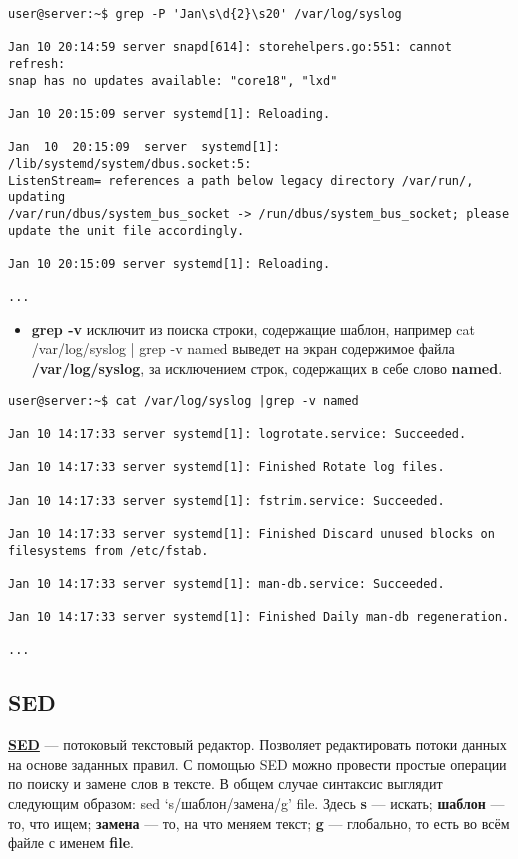 \documentclass[14pt, a4paper]{article}
\begin{document}
\begin{lstlisting}
user@server:~$ grep -P 'Jan\s\d{2}\s20' /var/log/syslog

Jan 10 20:14:59 server snapd[614]: storehelpers.go:551: cannot refresh: 
snap has no updates available: "core18", "lxd"

Jan 10 20:15:09 server systemd[1]: Reloading.

Jan  10  20:15:09  server  systemd[1]:  /lib/systemd/system/dbus.socket:5:
ListenStream= references a path below legacy directory /var/run/, updating
/var/run/dbus/system_bus_socket -> /run/dbus/system_bus_socket; please 
update the unit file accordingly.

Jan 10 20:15:09 server systemd[1]: Reloading.

...
\end{lstlisting}

\begin{itemize}
    \item \textbf{grep -v} исключит из поиска строки, содержащие шаблон, например \colorbox{backcolour}{cat /var/log/syslog
    | grep -v} named выведет на экран содержимое файла \textbf{/var/log/syslog}, за исключением строк,
    содержащих в себе слово \textbf{named}.
\end{itemize}

\begin{lstlisting}
user@server:~$ cat /var/log/syslog |grep -v named

Jan 10 14:17:33 server systemd[1]: logrotate.service: Succeeded.

Jan 10 14:17:33 server systemd[1]: Finished Rotate log files.

Jan 10 14:17:33 server systemd[1]: fstrim.service: Succeeded.

Jan 10 14:17:33 server systemd[1]: Finished Discard unused blocks on 
filesystems from /etc/fstab.

Jan 10 14:17:33 server systemd[1]: man-db.service: Succeeded.

Jan 10 14:17:33 server systemd[1]: Finished Daily man-db regeneration.

...
\end{lstlisting}

\subsection*{SED} 

\href{https://habr.com/ru/company/ruvds/blog/327530/}{\textbf{SED}} — потоковый текстовый редактор. Позволяет редактировать потоки данных на основе заданных
правил. С помощью SED можно провести простые операции по поиску и замене слов в тексте. В
общем случае синтаксис выглядит следующим образом:\colorbox{backcolour}{ sed ‘s/шаблон/замена/g’ file}. Здесь \textbf{s}
— искать; \textbf{шаблон} — то, что ищем; \textbf{замена} — то, на что меняем текст; \textbf{g} — глобально, то есть во всём
файле с именем \textbf{file}.\\
\end{document}
